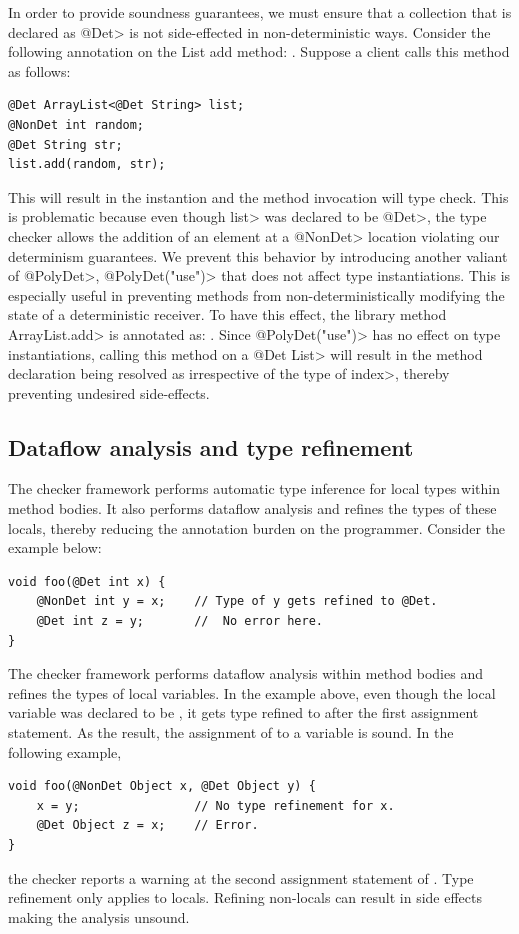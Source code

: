 In order to provide soundness guarantees, we must ensure that a collection that is
declared as \<@Det> is not side-effected in non-deterministic ways. Consider the following annotation 
on the List add method: .
Suppose a client calls this method as follows:
\begin{verbatim}
@Det ArrayList<@Det String> list;
@NonDet int random;
@Det String str;
list.add(random, str);
\end{verbatim}
This will result in the instantion  and
the method invocation will type check. This is problematic because even though \<list> was declared to be \<@Det>,
the type checker allows the addition of an element at a \<@NonDet> location violating our determinism guarantees.
We prevent this behavior by introducing another valiant of \<@PolyDet>, \<@PolyDet("use")> that does not affect
type instantiations. This is especially useful in preventing methods from non-deterministically modifying the state
of a deterministic receiver. To have this effect, the library method \<ArrayList.add> is annotated as:
.
Since \<@PolyDet("use")> has no effect on type instantiations, calling this method on a \<@Det List>
will result in the method declaration being resolved as 
irrespective of the type of \<index>, thereby preventing undesired side-effects.

\subsection{Dataflow analysis and type refinement}\label{dataflow}
The checker framework performs automatic type inference for local types within method bodies.
It also performs dataflow analysis and refines the types of these locals, thereby reducing the annotation burden 
on the programmer. Consider the example below:
\begin{verbatim}
void foo(@Det int x) {
    @NonDet int y = x;    // Type of y gets refined to @Det.
    @Det int z = y;       //  No error here.
}
\end{verbatim}
The checker framework performs dataflow analysis within method bodies and refines the types of local variables.
In the example above, even though the local variable  was declared to be , it gets
type refined to  after the first assignment statement. As the result, the assignment of 
to a  variable  is sound. In the following example,
\begin{verbatim}
void foo(@NonDet Object x, @Det Object y) {
    x = y;                // No type refinement for x.
    @Det Object z = x;    // Error.
}
\end{verbatim}
the checker reports a warning at the second assignment statement of . Type refinement only applies to locals. Refining non-locals can result in side effects making the analysis unsound.

